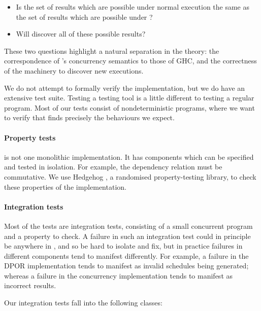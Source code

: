 \begin{itemize}
\item Is the set of results which are possible under normal execution
  the same as the set of results which are possible under \dejafu{}?
\item Will \dejafu{} discover all of these possible results?
\end{itemize}

These two questions highlight a natural separation in the theory: the
correspondence of \dejafu{}'s concurrency semantics to those of GHC,
and the correctness of the machinery to discover new executions.

We do not attempt to formally verify the \dejafu{} implementation, but
we do have an extensive test suite.  Testing a testing tool is a
little different to testing a regular program.  Most of our tests
consist of nondeterministic programs, where we want to verify that
\dejafu{} finds precisely the behaviours we expect.

\paragraph{Property tests}
\dejafu{} is not one monolithic implementation.  It has components
which can be specified and tested in isolation.  For example, the
dependency relation must be commutative.  We use
Hedgehog \parencite{hedgehog}, a randomised property-testing library, to
check these properties of the implementation.

\paragraph{Integration tests}
Most of the tests are integration tests, consisting of a small
concurrent program and a property to check.  A failure in such an
integration test could in principle be anywhere in \dejafu{}, and so
be hard to isolate and fix, but in practice failures in different
components tend to manifest differently.  For example, a failure in
the DPOR implementation tends to manifest as invalid schedules being
generated; whereas a failure in the concurrency implementation tends
to manifest as incorrect results.

Our integration tests fall into the following classes:


